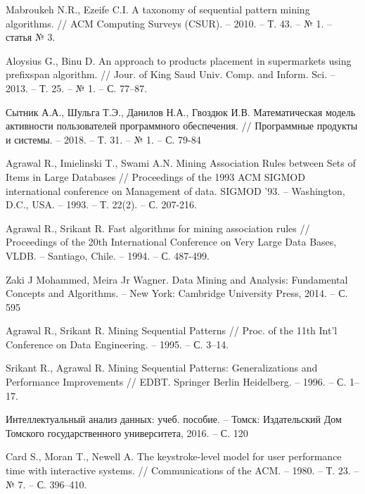 \begin{thebibliography}{1}
	Mabroukeh N.R., Ezeife C.I.
	A taxonomy of sequential pattern mining algorithms.
	// ACM Computing Surveys (CSUR). -- 2010. -- Т. 43. -- № 1. -- статья № 3.
	
	Aloysius G., Binu D.
	An approach to products placement in supermarkets using prefixspan algorithm.
	// Jour. of King Saud Univ. Comp. and Inform. Sci. -- 2013. -- Т. 25. -- № 1. -- С. 77–87.
	
	Сытник А.А., Шульга Т.Э., Данилов Н.А., Гвоздюк И.В.
	Математическая модель активности пользователей программного обеспечения.
	// Программные продукты и системы. -- 2018. -- Т. 31. -- № 1. -- С. 79-84 
	
	Agrawal R., Imielinski T., Swami A.N.
	Mining Association Rules between Sets of Items in Large Databases
	// Proceedings of the 1993 ACM SIGMOD international conference on Management of data. SIGMOD '93. -- Washington, D.C., USA. -- 1993. -- Т. 22(2). -- С. 207-216.
	
	Agrawal R., Srikant R.
	Fast algorithms for mining association rules
	// Proceedings of the 20th International Conference on Very Large Data Bases, VLDB. -- Santiago, Chile. -- 1994. -- С. 487-499.
	
	Zaki J Mohammed, Meira Jr Wagner. Data Mining and Analysis: Fundamental Concepts and Algorithms. -- New York: Cambridge University Press, 2014. -- С. 595
	
	Agrawal R., Srikant R. Mining Sequential Patterns // Proc. of the 11th Int’l
	Conference on Data Engineering. -- 1995. -- С. 3–14.
	
	Srikant R., Agrawal R. Mining Sequential Patterns: Generalizations and
	Performance Improvements // EDBT. Springer Berlin Heidelberg. -- 1996.
	-- С. 1–17.
	
	Интеллектуальный анализ данных: учеб. пособие. --
	Томск: Издательский Дом Томского государственного
	университета, 2016. -- С. 120
	
	Card S., Moran T., Newell A.
	The keystroke-level model for user performance time with interactive systems.
	// Communications of the ACM. -- 1980. -- Т. 23. -- № 7. -- С. 396–410.
	
	
\end{thebibliography}
